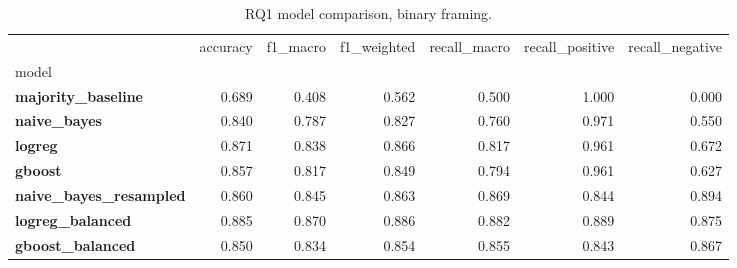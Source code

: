 \begin{table}
\caption{RQ1 model comparison, binary framing.}
\label{tab:rq1_binary}
\begin{tabular}{lrrrrrr}
\toprule
 & accuracy & f1_macro & f1_weighted & recall_macro & recall_positive & recall_negative \\
model &  &  &  &  &  &  \\
\midrule
\textbf{majority_baseline} & 0.689 & 0.408 & 0.562 & 0.500 & 1.000 & 0.000 \\
\textbf{naive_bayes} & 0.840 & 0.787 & 0.827 & 0.760 & 0.971 & 0.550 \\
\textbf{logreg} & 0.871 & 0.838 & 0.866 & 0.817 & 0.961 & 0.672 \\
\textbf{gboost} & 0.857 & 0.817 & 0.849 & 0.794 & 0.961 & 0.627 \\
\textbf{naive_bayes_resampled} & 0.860 & 0.845 & 0.863 & 0.869 & 0.844 & 0.894 \\
\textbf{logreg_balanced} & 0.885 & 0.870 & 0.886 & 0.882 & 0.889 & 0.875 \\
\textbf{gboost_balanced} & 0.850 & 0.834 & 0.854 & 0.855 & 0.843 & 0.867 \\
\bottomrule
\end{tabular}
\end{table}

